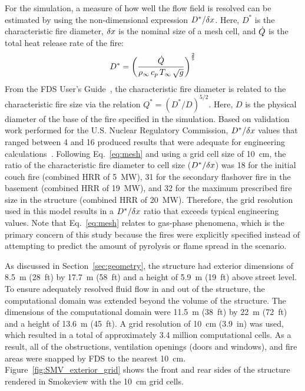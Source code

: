 \documentclass[12pt,oneside]{book}
\begin{document}
For the simulation, a measure of how well the flow field is resolved can be estimated by using the non-dimensional expression $D^*/\delta x$. Here, $D^*$ is the characteristic fire diameter, $\delta x$ is the nominal size of a mesh cell, and $\dot{Q}$ is the total heat release rate of the fire:
\begin{equation}
D^* = \left(
     \frac{\dot{Q}}{\rho_\infty \, c_p \, T_\infty \, \sqrt{g}}
     \right)^\frac{2}{5}
\label{eq:mesh}
\end{equation}
From the FDS User's Guide~\cite{FDS_Users_Guide}, the characteristic fire diameter is related to the characteristic fire size via the relation $Q^* = (D^*/D)^{5/2}$. Here, $D$ is the physical diameter of the base of the fire specified in the simulation. Based on validation work performed for the U.S. Nuclear Regulatory Commission, $D^*/\delta x$ values that ranged between 4 and 16 produced results that were adequate for engineering calculations~\cite{NUREG_1824}. Following Eq.~\ref{eq:mesh} and using a grid cell size of 10~cm, the ratio of the characteristic fire diameter to cell size ($D^*/\delta x$) was 18 for the initial couch fire (combined HRR of 5~MW), 31 for the secondary flashover fire in the basement (combined HRR of 19~MW), and 32 for the maximum prescribed fire size in the structure (combined HRR of 20~MW). Therefore, the grid resolution used in this model results in a $D^*/\delta x$ ratio that exceeds typical engineering values. Note that Eq.~\ref{eq:mesh} relates to gas-phase phenomena, which is the primary concern of this study because the fires were explicitly specified instead of attempting to predict the amount of pyrolysis or flame spread in the scenario.

As discussed in Section~\ref{sec:geometry}, the structure had exterior dimensions of 8.5~m (28~ft) by 17.7~m (58~ft) and a height of 5.9~m (19~ft) above street level. To ensure adequately resolved fluid flow in and out of the structure, the computational domain was extended beyond the volume of the structure. The dimensions of the computational domain were 11.5~m (38~ft) by 22~m (72~ft) and a height of 13.6~m (45~ft). A grid resolution of 10~cm (3.9~in) was used, which resulted in a total of approximately 3.4 million computational cells. As a result, all of the obstructions, ventilation openings (doors and windows), and fire areas were snapped by FDS to the nearest 10~cm. Figure~\ref{fig:SMV_exterior_grid} shows the front and rear sides of the structure rendered in Smokeview with the 10~cm grid cells.
\end{document}
